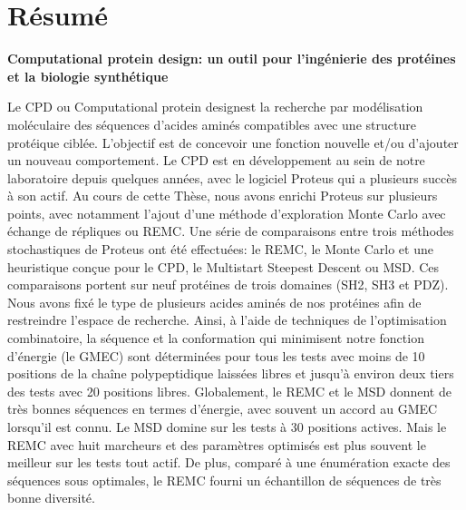 

\section*{Résumé}

{\large\bf\noindent Computational protein design: un outil pour l’ingénierie des protéines et la biologie synthétique}

\bigskip

Le CPD ou \og Computational protein design\fg est la recherche par modélisation moléculaire des séquences d’acides aminés compatibles avec une structure protéique ciblée.
L’objectif est de concevoir une fonction nouvelle et/ou d’ajouter un nouveau comportement.
Le CPD est en développement au sein de notre laboratoire depuis quelques années, avec le logiciel Proteus qui a plusieurs succès à son actif.
Au cours de cette Thèse, nous avons enrichi Proteus sur plusieurs points, avec notamment l’ajout d’une méthode d’exploration Monte Carlo avec échange de répliques ou REMC. Une série de comparaisons entre trois méthodes stochastiques de Proteus ont été effectuées: le REMC, le Monte Carlo et une heuristique conçue pour le CPD, le \og Multistart Steepest Descent \fg ou MSD. Ces comparaisons portent sur neuf protéines de trois domaines (SH2, SH3 et PDZ). Nous avons fixé le type de plusieurs acides aminés de nos protéines afin de restreindre l’espace de recherche. Ainsi, à l'aide de techniques de l'optimisation combinatoire, la séquence et la conformation qui minimisent notre fonction d’énergie (le GMEC) sont déterminées pour tous les tests avec moins de 10 positions de la chaîne polypeptidique laissées libres et jusqu’à environ deux tiers des tests avec 20 positions libres. Globalement, le REMC et le MSD donnent de très bonnes séquences en termes d’énergie, avec souvent un accord au GMEC lorsqu’il est connu. Le MSD domine sur les tests à 30 positions actives. Mais le REMC avec huit marcheurs et des paramètres optimisés est plus souvent le meilleur sur les tests tout actif. De plus, comparé à une énumération exacte des séquences sous optimales, le REMC fourni un échantillon de séquences de très bonne diversité.

